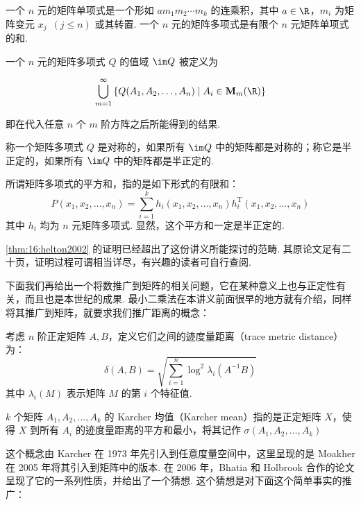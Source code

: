 \begin{definition}
    一个 $n$ 元的矩阵单项式是一个形如 $am_1m_2 \cdots m_k$ 的连乘积，其中 $a \in \R$，$m_i$ 为矩阵变元 $x_j \enspace(j \leqslant n)$ 或其转置. 一个 $n$ 元的矩阵多项式是有限个 $n$ 元矩阵单项式的和.
\end{definition}

\begin{definition}
    一个 $n$ 元的矩阵多项式 $Q$ 的值域 $\im Q$ 被定义为

    \[ \bigcup_{m = 1}^\infty\left\{Q(A_1, A_2, \ldots, A_n) \mid A_i \in \mathbf{M}_m(\R)\right\} \]

    即在代入任意 $n$ 个 $m$ 阶方阵之后所能得到的结果.
\end{definition}

\begin{definition}
    称一个矩阵多项式 $Q$ 是对称的，如果所有 $\im Q$ 中的矩阵都是对称的；称它是半正定的，如果所有 $\im Q$ 中的矩阵都是半正定的.
\end{definition}

\begin{definition}
    所谓矩阵多项式的平方和，指的是如下形式的有限和：
    \[ P(x_1, x_2, \ldots, x_n) = \sum_{i = 1}^k h_i(x_1, x_2, \ldots, x_n)h_i^\mathrm{T}(x_1, x_2, \ldots, x_n) \]
    其中 $h_i$ 均为 $n$ 元矩阵多项式. 显然，这个平方和一定是半正定的.
\end{definition}

\autoref{thm:16:helton2002} 的证明已经超出了这份讲义所能探讨的范畴. 其原论文足有二十页，证明过程可谓相当详尽，有兴趣的读者可自行查阅.

下面我们再给出一个将数推广到矩阵的相关问题，它在某种意义上也与正定性有关，而且也是本世纪的成果. 最小二乘法在本讲义前面很早的地方就有介绍，同样将其推广到矩阵，就要求我们推广距离的概念：

\begin{definition}
    考虑 $n$ 阶正定矩阵 $A, B$，定义它们之间的迹度量距离（trace metric distance）为：
    \[ \delta(A, B) = \sqrt{\sum_{i = 1}^n \log^2\lambda_i(A^{-1}B)} \]
    其中 $\lambda_i(M)$ 表示矩阵 $M$ 的第 $i$ 个特征值.
\end{definition}

\begin{definition}
    $k$ 个矩阵 $A_1, A_2, \ldots, A_k$ 的 Karcher 均值（Karcher mean）指的是正定矩阵 $X$，使得 $X$ 到所有 $A_i$ 的迹度量距离的平方和最小，将其记作 $\sigma(A_1, A_2, \ldots, A_k)$
\end{definition}

这个概念由 Karcher 在 1973 年先引入到任意度量空间中，这里呈现的是 Moakher 在 2005 年将其引入到矩阵中的版本. 在 2006 年，Bhatia 和 Holbrook 合作的论文呈现了它的一系列性质，并给出了一个猜想. 这个猜想是对下面这个简单事实的推广：

